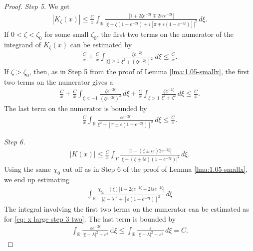 \documentclass[GreensFunctions.tex]{subfiles}
\begin{document}
\begin{proof}
	{\em Step 5.}
	We get
	\begin{align*}
		\left|K_\zeta(x)\right| 
			\le 
				\frac C x
				\int_{\mathbb R} 
					\frac{|1+2\zeta e^{-2\xi}\mp 2i\varepsilon e^{-2\xi}|}
						{|\xi+\zeta(1-e^{-2\xi})+i[\pi\mp\varepsilon(1-e^{-2\xi})]|^2}
				\,d\xi.
	\end{align*}
	If $0<\zeta<\zeta_0$ for some small $\zeta_0$, the first two terms on the numerator of 
	the integrand of $K_\zeta(x)$ can be estimated by
	\begin{align*}
		\frac Cx 
		+ \frac Cx 
		\int_{|\xi|\ge 1}\frac{\zeta e^{-2\xi}}{\xi^2+(\zeta e^{-2\xi})^2}~d\xi 
		\le 	
			\frac Cx.
	\end{align*}
	If $\zeta>\zeta_0$, then, as in Step 5 from the proof of Lemma \ref{lma:1.05-smallx},
	the first two terms on the numerator gives a
	\begin{align*}
		\frac Cx 
		+\frac Cx 
		\int_{\xi<-1}
			\frac{\zeta e^{-2\xi}}{(\zeta e^{-2\xi})^2}
		\,d\xi 
		+ \frac Cx 
		\int_{\xi>1}
			\frac{\zeta e^{-2\xi}}{\xi^2+\zeta^2}
		\,d\xi
		\le 
			\frac Cx.
	\end{align*}
	The last term on the numerator is bounded by
	\begin{align*}
		\frac Cx 
		\int_{\mathbb R} 
			\frac{\varepsilon e^{-2\xi}}{\xi^2 + [\pi\pm\varepsilon(1-e^{-2\xi})]^2}
		\,d\xi
		\le \frac Cx.
	\end{align*}



	{\em Step 6.} 
	\begin{align*}
		|K(x)|
			\le \frac Cx 
				\int_\Gamma 
					\frac{|1-(\zeta\pm i\varepsilon)2e^{-2\xi}|}
						{|\xi-(\zeta\pm i\varepsilon)(1-e^{-2\xi})|^2}
				\,d\xi.	
	\end{align*}
	Using the same $\chi_0$ cut off as in Step 6 of the proof of Lemma \ref{lma:1.05-smallx}, 
	we end up estimating
	\begin{align*}
		\int_{\mathbb R} 
			\frac{\chi_{\xi_0+}(\xi)|1-2\zeta e^{-2\xi}\mp 2i\varepsilon e^{-2\xi}|}
				{|\xi-\lambda|^2+[\varepsilon(1-e^{-2\xi})]^2}
		\,d\xi
	\end{align*}
	The integral involving the first two terms on the numerator can be estimated as for 
	\eqref{eq: x large step 3 two}. The last term is bounded by
	\begin{align*}
		\int_{\mathbb R} 
			\frac{\varepsilon e^{-2\xi}}{|\xi-\lambda|^2+\varepsilon^2}
		\, \mathrm{d}\xi 
		\le 
			\int_{\mathbb R} \frac{\varepsilon }{|\xi-\lambda|^2+\varepsilon^2} \,d\xi 
		= C.
	\end{align*}



\end{proof}
\end{document}
